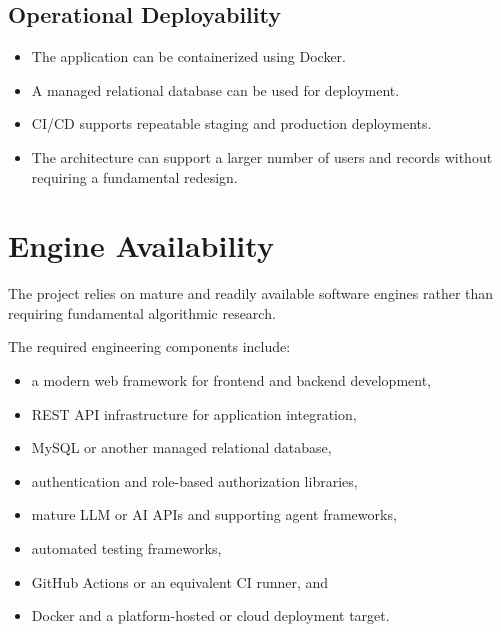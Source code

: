 \documentclass{tietreport}
\begin{document}
\subsection{Operational Deployability}

\begin{itemize}

    \item The application can be containerized using Docker.

    \item A managed relational database can be used for deployment.

    \item CI/CD supports repeatable staging and production deployments.

    \item The architecture can support a larger number of users and
    records without requiring a fundamental redesign.

\end{itemize}

\section{Engine Availability}

The project relies on mature and readily available software engines rather
than requiring fundamental algorithmic research.

The required engineering components include:

\begin{itemize}

    \item a modern web framework for frontend and backend development,

    \item REST API infrastructure for application integration,

    \item MySQL or another managed relational database,

    \item authentication and role-based authorization libraries,

    \item mature LLM or AI APIs and supporting agent frameworks,

    \item automated testing frameworks,

    \item GitHub Actions or an equivalent CI runner, and

    \item Docker and a platform-hosted or cloud deployment target.

\end{itemize}
\end{document}
